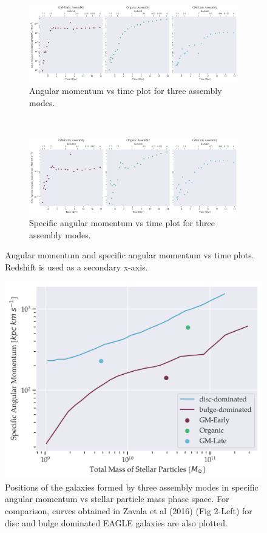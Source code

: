 \documentclass{article}
\begin{document}
	\begin{figure}
		\centering
		\begin{subfigure} {\columnwidth}
				\centering 
				\includegraphics[width=\columnwidth]{../../plots/angular_momentum/time-net_angular_momentum.png}
				\caption{Angular momentum vs time plot for three assembly modes.}
		\end{subfigure} \\
			\vspace{1cm}
		\begin{subfigure} {\columnwidth}
				\centering 
				\includegraphics[width=\columnwidth]{../../plots/angular_momentum/time-net_specific_angular_momentum.png}
				\caption{Specific angular momentum vs time plot for three assembly modes.}
		\end{subfigure}
		
		\caption{Angular momentum and specific angular momentum vs time plots. Redshift is used as a secondary x-axis.}
	\end{figure}

	\begin{figure}
		\centering
		\includegraphics[width=.5\columnwidth]{../../plots/angular_momentum/zavala_fig2l.png}
				\caption{Positions of the galaxies formed by three assembly modes in specific angular momentum vs stellar particle mass phase space. For comparison, curves obtained in Zavala et al (2016) (Fig 2-Left) for disc and bulge dominated EAGLE galaxies are also plotted.}
	\end{figure}
\end{document}
